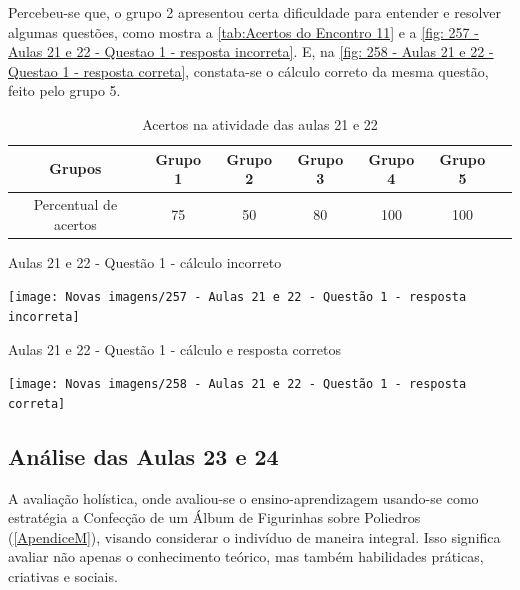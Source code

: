 Percebeu-se que, o grupo 2 apresentou certa dificuldade para entender e resolver algumas questões, como mostra a \autoref{tab:Acertos do Encontro 11} e a \autoref{fig: 257 - Aulas 21 e 22 - Questao 1 - resposta incorreta}. E, na \autoref{fig: 258 - Aulas 21 e 22 - Questao 1 - resposta correta}, constata-se o cálculo correto da mesma questão, feito pelo grupo 5.

\begin{table}[htbp] \centering
    \caption{Acertos na atividade das aulas 21 e 22} \label{tab:Acertos do Encontro 11}
    \begin{tabular}{|c|c|c|c|c|c|c|}
        \hline
        \textbf{Grupos}       & \textbf{Grupo 1} & \textbf{Grupo 2} & \textbf{Grupo 3} & \textbf{Grupo 4} & \textbf{Grupo 5} \\
        \hline
        Percentual de acertos & 75               & 50               & 80               & 100              & 100              \\
        \hline
    \end{tabular}
    \legend{\legendaTabela}
\end{table}

\begin{CenteredFigure}
    \caption{Aulas 21 e 22 - Questão 1 - cálculo incorreto} \label{fig: 257 - Aulas 21 e 22 - Questao 1 - resposta incorreta}
    \texttt{[image: Novas imagens/257 - Aulas 21 e 22 - Questão 1 - resposta incorreta]}
    \legend{\autoria}
\end{CenteredFigure}

\begin{CenteredFigure}
    \caption{Aulas 21 e 22 - Questão 1 - cálculo e resposta corretos} \label{fig: 258 - Aulas 21 e 22 - Questao 1 - resposta correta}
    \texttt{[image: Novas imagens/258 - Aulas 21 e 22 - Questão 1 - resposta correta]}
    \legend{\autoria}
\end{CenteredFigure}

\subsection{Análise das Aulas 23 e 24}

A avaliação holística, onde avaliou-se o ensino-aprendizagem usando-se como estratégia a Confecção de um Álbum de Figurinhas sobre Poliedros (\autoref{ApendiceM}), visando considerar o indivíduo de maneira integral. Isso significa avaliar não apenas o conhecimento teórico, mas também habilidades práticas, criativas e sociais.

